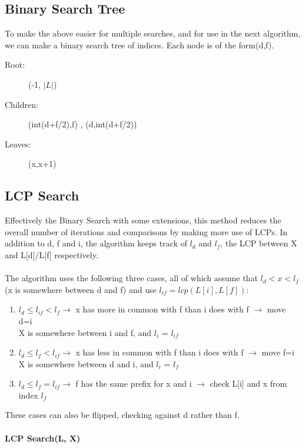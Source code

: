 \subsection{Binary Search Tree}
To make the above easier for multiple searches, and for use in the next algorithm, we can make a binary search tree of indices. Each node is of the form(d,f).
\begin{description}
    \item [Root:] (-1, $|L|$)
    \item [Children:] (int(d+f/2),f) , (d,int(d+f/2))
    \item [Leaves:] (x,x+1)
\end{description}


\subsection{LCP Search}
Effectively the Binary Search with some extensions, this method reduces the overall number of iterations and comparisons by making more use of LCPs. In addition to d, f and i, the algorithm keeps track of $l_d$ and $l_f$, the LCP between X and L[d]/L[f] respectively.\\ \\
The algorithm uses the following three cases, all of which assume that \(l_d < x < l_f\) (x is somewhere between d and f) and use $l_{if} = lcp(L[i],L[f])$:
\begin{enumerate}
    \item \(l_d \leq l_{if} < l_f \rightarrow\) x has more in common with f than i does with f $\rightarrow$ move d=i \\
    X is somewhere between i and f, and $l_i$ = $l_{if}$
    \item \(l_d \leq l_f < l_{if} \rightarrow\) x has less in common with f than i does with f $\rightarrow$ move f=i \\     
    X is somewhere between d and i, and $l_i$ = $l_{f}$
    \item \(l_d \leq l_f = l_{if} \rightarrow\) f has the same prefix for x and i $\rightarrow$ check L[i] and x from index $l_f$         
\end{enumerate}
These cases can also be flipped, checking against d rather than f. \\ \\
\textbf{LCP Search(L, X)} 
